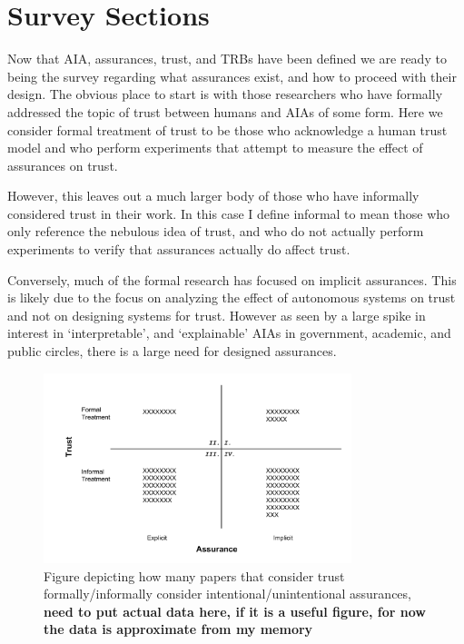 \section{Survey Sections} \label{sec:survey}
Now that AIA, assurances, trust, and TRBs have been defined we are ready to being the survey regarding what assurances exist, and how to proceed with their design. The obvious place to start is with those researchers who have formally addressed the topic of trust between humans and AIAs of some form. Here we consider formal treatment of trust to be those who acknowledge a human trust model and who perform experiments that attempt to measure the effect of assurances on trust.

However, this leaves out a much larger body of those who have informally considered trust in their work. In this case I define informal to mean those who only reference the nebulous idea of trust, and who do not actually perform experiments to verify that assurances actually do affect trust.

Conversely, much of the formal research has focused on implicit assurances. This is likely due to the focus on analyzing the effect of autonomous systems on trust and not on designing systems for trust. However as seen by a large spike in interest in `interpretable', and `explainable' AIAs in government, academic, and public circles, there is a large need for designed assurances.

\begin{figure}[htbp]
    \centering
    \includegraphics[width=0.8\textwidth]{Figures/Trust_vs_Assurance_Intention.pdf}
    \caption{Figure depicting how many papers that consider trust formally/informally consider intentional/unintentional assurances, \textbf{need to put actual data here, if it is a useful figure, for now the data is approximate from my memory}}
    \label{fig:trust_assurance_intention}
\end{figure}

